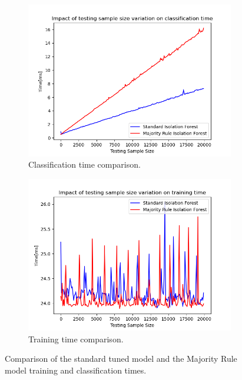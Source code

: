 \documentclass[futureinternet,article,submit,pdftex,moreauthors]{Definitions/mdpi}
\begin{document}
\begin{figure}[H]
	\centering
	\begin{subfigure}{0.49\textwidth}
		\centering
		\includegraphics[width=\textwidth]{img/classificationTimeComparison.png}
		\caption{Classification time comparison.}
		\label{fig:majority_rule_classification_time}
	\end{subfigure}
	\hfill
	\begin{subfigure}{0.49\textwidth}
		\centering
		\includegraphics[width=\textwidth]{img/trainingTimeComparison.png}
		\caption{Training time comparison.}
		\label{fig:majority_rule_training_time}
	\end{subfigure}
	\caption{Comparison of the standard tuned model and the Majority Rule model training and classification times.}
	\label{fig:majority_rule_time_comparison}
\end{figure}
\end{document}
